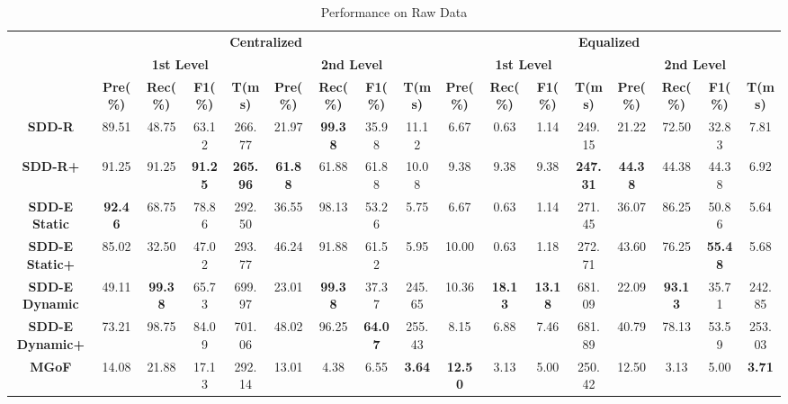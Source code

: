 \documentclass{article}
\begin{document}
			\begin{table}
				\centering
				\caption{Performance on Raw Data}
				\label{tab:result-koubei-raw}
				\footnotesize
				\begin{tabular}{|c|c|c|c|c|c|c|c|c|c|c|c|c|c|c|c|c|}
					\hline
					\multirow{3}{*}{\textbf{}} & \multicolumn{8}{c|}{\textbf{Centralized}} & \multicolumn{8}{c|}{\textbf{Equalized}} \\ \cline{2-17} 
					& \multicolumn{4}{c|}{\textbf{1st Level}} & \multicolumn{4}{c|}{\textbf{2nd Level}} & \multicolumn{4}{c|}{\textbf{1st Level}} & \multicolumn{4}{c|}{\textbf{2nd Level}} \\ \cline{2-17} 
					& \textbf{Pre(\%)} & \textbf{Rec(\%)} & \textbf{F1(\%)} & \textbf{T(ms)} & \textbf{Pre(\%)} & \textbf{Rec(\%)} & \textbf{F1(\%)} & \textbf{T(ms)} & \textbf{Pre(\%)} & \textbf{Rec(\%)} & \textbf{F1(\%)} & \textbf{T(ms)} & \textbf{Pre(\%)} & \textbf{Rec(\%)} & \textbf{F1(\%)} & \textbf{T(ms)} \\ \hline
					\textbf{SDD-R} & 89.51 & 48.75 & 63.12 & 266.77 & 21.97 & \textbf{99.38} & 35.98 & 11.12 & 6.67 & 0.63 & 1.14 & 249.15 & 21.22 & 72.50 & 32.83 & 7.81 \\ \hline
					\textbf{SDD-R+} & 91.25 & 91.25 & \textbf{91.25} & \textbf{265.96} & \textbf{61.88} & 61.88 & 61.88 & 10.08 & 9.38 & 9.38 & 9.38 & \textbf{247.31} & \textbf{44.38} & 44.38 & 44.38 & 6.92 \\ \hline
					\textbf{SDD-E Static} & \textbf{92.46} & 68.75 & 78.86 & 292.50 & 36.55 & 98.13 & 53.26 & 5.75 & 6.67 & 0.63 & 1.14 & 271.45 & 36.07 & 86.25 & 50.86 & 5.64 \\ \hline
					\textbf{SDD-E Static+} & 85.02 & 32.50 & 47.02 & 293.77 & 46.24 & 91.88 & 61.52 & 5.95 & 10.00 & 0.63 & 1.18 & 272.71 & 43.60 & 76.25 & \textbf{55.48} & 5.68 \\ \hline
					\textbf{SDD-E Dynamic} & 49.11 & \textbf{99.38} & 65.73 & 699.97 & 23.01 & \textbf{99.38} & 37.37 & 245.65 & 10.36 & \textbf{18.13} & \textbf{13.18} & 681.09 & 22.09 & \textbf{93.13} & 35.71 & 242.85 \\ \hline
					\textbf{SDD-E Dynamic+} & 73.21 & 98.75 & 84.09 & 701.06 & 48.02 & 96.25 & \textbf{64.07} & 255.43 & 8.15 & 6.88 & 7.46 & 681.89 & 40.79 & 78.13 & 53.59 & 253.03 \\ \hline
					\textbf{MGoF} & 14.08 & 21.88 & 17.13 & 292.14 & 13.01 & 4.38 & 6.55 & \textbf{3.64} & \textbf{12.50} & 3.13 & 5.00 & 250.42 & 12.50 & 3.13 & 5.00 & \textbf{3.71} \\ \hline
				\end{tabular}
				

\end{table}
\end{document}
